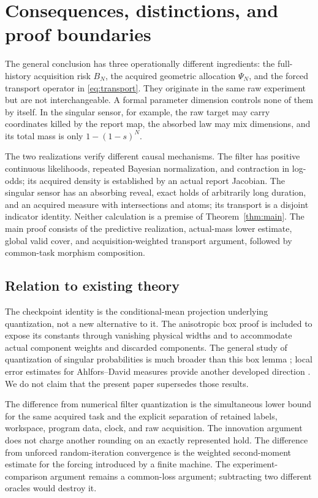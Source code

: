 \section{Consequences, distinctions, and proof boundaries}\label{sec:scope}
The general conclusion has three operationally different ingredients: the full-history acquisition risk $B_N$, the acquired geometric allocation $\Psi_N$, and the forced transport operator in \eqref{eq:transport}. They originate in the same raw experiment but are not interchangeable. A formal parameter dimension controls none of them by itself. In the singular sensor, for example, the raw target may carry coordinates killed by the report map, the absorbed law may mix dimensions, and its total mass is only $1-(1-s)^N$.

The two realizations verify different causal mechanisms. The filter has positive continuous likelihoods, repeated Bayesian normalization, and contraction in log-odds; its acquired density is established by an actual report Jacobian. The singular sensor has an absorbing reveal, exact holds of arbitrarily long duration, and an acquired measure with intersections and atoms; its transport is a disjoint indicator identity. Neither calculation is a premise of Theorem~\ref{thm:main}. The main proof consists of the predictive realization, actual-mass lower estimate, global valid cover, and acquisition-weighted transport argument, followed by common-task morphism composition.

\subsection{Relation to existing theory}
The checkpoint identity is the conditional-mean projection underlying quantization, not a new alternative to it. The anisotropic box proof is included to expose its constants through vanishing physical widths and to accommodate actual component weights and discarded components. The general study of quantization of singular probabilities is much broader than this box lemma \cite{graf}; local error estimates for Ahlfors--David measures provide another developed direction \cite{zhu}. We do not claim that the present paper supersedes those results.

The difference from numerical filter quantization \cite{pages,sellami,feuer} is the simultaneous lower bound for the same acquired task and the explicit separation of retained labels, workspace, program data, clock, and raw acquisition. The innovation argument does not charge another rounding on an exactly represented hold. The difference from unforced random-iteration convergence \cite{diaconis} is the weighted second-moment estimate for the forcing introduced by a finite machine. The experiment-comparison argument \cite{blackwell} remains a common-loss argument; subtracting two different oracles would destroy it.

